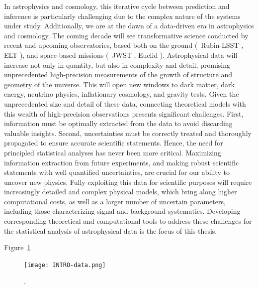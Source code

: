 In astrophysics and cosmology, this iterative cycle between prediction and inference is particularly challenging due to the complex nature of the systems under study. 
Additionally, we are at the dawn of a data-driven era in astrophysics and cosmology. The coming decade will see transformative science conducted by recent and upcoming observatories, based both on the ground (\eg\ Rubin-LSST \cite{LSSTDarkEnergyScience:2012kar}, ELT \cite{Simon:2019aa}), and space-based missions (\eg\ JWST \citep{Gardner:2006ky}, Euclid \cite{Refregier:2010ss}). Astrophysical data will increase not only in quantity, but also in complexity and detail, promising unprecedented high-precision measurements of the growth of structure and geometry of the universe. This will open new windows to dark matter, dark energy, neutrino physics, inflationary cosmology, and gravity tests. 
Given the unprecedented size and detail of these data, connecting theoretical models with this wealth of high-precision observations presents significant challenges. First, information must be optimally extracted from the data to avoid discarding valuable insights. Second, uncertainties must be correctly treated and thoroughly propagated to ensure accurate scientific statements. Hence, the need for principled statistical analyses has never been more critical. Maximizing information extraction from future experiments, and making robust scientific statements with well quantified uncertainties, are crucial for our ability to uncover new physics. Fully exploiting this data for scientific purposes will require increasingly detailed and complex physical models, which bring along higher computational costs, as well as a larger number of uncertain parameters, including those characterizing signal and background systematics. Developing corresponding theoretical and computational tools to address these challenges for the statistical analysis of astrophysical data is the focus of this thesis.

Figure~\ref{fig:intro-data}

\begin{figure}
    \centering
	\texttt{[image: INTRO-data.png]}
    \caption{.}
    \label{fig:intro-data}
\end{figure}












